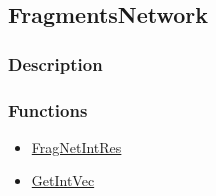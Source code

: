 \subsection{FragmentsNetwork}\label{FragmentsNetwork}
\subsubsection{Description}


\subsubsection{Functions}
\begin{itemize}
\item \hyperref[FragNetIntRes]{FragNetIntRes}
\item \hyperref[GetIntVec]{GetIntVec}
\end{itemize}

